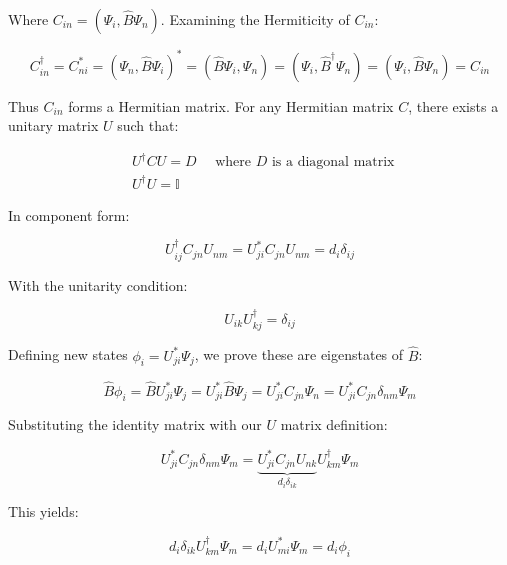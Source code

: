 \documentclass[10pt]{article}
\begin{document}
Where $C_{i n}=\left(\Psi_{i}, \hat{B} \Psi_{n}\right)$. Examining the Hermiticity of $C_{in}$:

\begin{equation*}
C_{i n}^{\dagger}=C_{n i}^{*}=\left(\Psi_{n}, \hat{B} \Psi_{i}\right)^{*}=\left(\hat{B} \Psi_{i}, \Psi_{n}\right)=\left(\Psi_{i}, \hat{B}^{\dagger} \Psi_{n}\right)=\left(\Psi_{i}, \hat{B} \Psi_{n}\right)=C_{i n} \tag{7.28}
\end{equation*}

Thus $C_{i n}$ forms a Hermitian matrix. For any Hermitian matrix $C$, there exists a unitary matrix $U$ such that:

\begin{align*}
& U^{\dagger} C U=D \quad \text { where } D \text { is a diagonal matrix } \\
& U^{\dagger} U=\mathbb{I} \tag{7.29}
\end{align*}

In component form:

\begin{equation*}
U_{i j}^{\dagger} C_{j n} U_{n m}=U_{j i}^{*} C_{j n} U_{n m}=d_{i} \delta_{i j} \tag{7.30}
\end{equation*}

With the unitarity condition:

\begin{equation*}
U_{i k} U_{k j}^{\dagger}=\delta_{i j} \tag{7.31}
\end{equation*}

Defining new states $\phi_{i}=U_{j i}^{*} \Psi_{j}$, we prove these are eigenstates of $\hat{B}$:

\begin{equation*}
\hat{B} \phi_{i}=\hat{B} U_{j i}^{*} \Psi_{j}=U_{j i}^{*} \hat{B} \Psi_{j}=U_{j i}^{*} C_{j n} \Psi_{n}=U_{j i}^{*} C_{j n} \delta_{n m} \Psi_{m} \tag{7.32}
\end{equation*}

Substituting the identity matrix with our $U$ matrix definition:

\begin{equation*}
U_{j i}^{*} C_{j n} \delta_{n m} \Psi_{m}=\underbrace{U_{j i}^{*} C_{j n} U_{n k}}_{d_{i} \delta_{i k}} U_{k m}^{\dagger} \Psi_{m} \tag{7.33}
\end{equation*}

This yields:

\begin{equation*}
d_{i} \delta_{i k} U_{k m}^{\dagger} \Psi_{m}=d_{i} U_{m i}^{*} \Psi_{m}=d_{i} \phi_{i} \tag{7.34}
\end{equation*}
\end{document}
